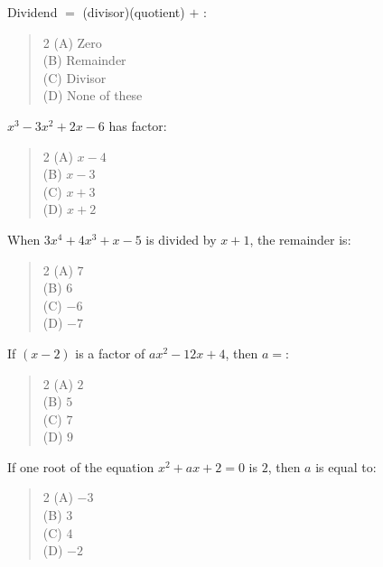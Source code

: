 \documentclass[11pt,a4paper]{article}
\begin{document}
\begin{mcqlist}
\item Dividend $=$ (divisor)(quotient) $+$ \underline{\hspace{1.5cm}}:
\begin{quote}\begin{multicols}{2}
\noindent (A) Zero \\
(B) Remainder \\
(C) Divisor \\
(D) None of these
\end{multicols}\end{quote}

\item $x^3-3x^2+2x-6$ has factor:
\begin{quote}\begin{multicols}{2}
\noindent (A) $x-4$ \\
(B) $x-3$ \\
(C) $x+3$ \\
(D) $x+2$
\end{multicols}\end{quote}

\item When $3x^4+4x^3+x-5$ is divided by $x+1$, the remainder is:
\begin{quote}\begin{multicols}{2}
\noindent (A) $7$ \\
(B) $6$ \\
(C) $-6$ \\
(D) $-7$
\end{multicols}\end{quote}

\item If $(x-2)$ is a factor of $ax^2-12x+4$, then $a=$:
\begin{quote}\begin{multicols}{2}
\noindent (A) $2$ \\
(B) $5$ \\
(C) $7$ \\
(D) $9$
\end{multicols}\end{quote}

\item If one root of the equation $x^2+ax+2=0$ is $2$, then $a$ is equal to:
\begin{quote}\begin{multicols}{2}
\noindent (A) $-3$ \\
(B) $3$ \\
(C) $4$ \\
(D) $-2$
\end{multicols}\end{quote}


\end{mcqlist}
\end{document}
